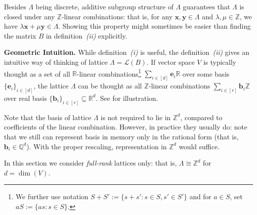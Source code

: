 \documentclass{template}
\begin{document}
Besides $\Lambda$ being discrete, additive subgroup structure of $\Lambda$
guarantees that $\Lambda$ is closed under any $\mathbb{Z}$-linear combinations:
that is, for any $\mathbf{x}, \mathbf{y} \in \Lambda$ and $\lambda, \mu \in
\mathbb{Z}$, we have $\lambda\mathbf{x} + \mu\mathbf{y} \in \Lambda$. Showing
this property might sometimes be easier than finding the matrix $B$ in
definition~\textit{(ii)} explicitly.

\textbf{Geometric Intuition.} While definition~\textit{(i)} is useful, the
definition~\textit{(ii)} gives an intuitive way of thinking of lattice $\Lambda
= \mathcal{L}(B)$. If vector space $V$ is typically thought as a set of all
$\mathbb{R}$-linear combinations\footnote{We further use notation $S+S':=\{s+s':
s \in S, s' \in S'\}$ and for $a \in S$, set $aS := \{as: s \in S\}$.} $\sum_{i
\in [d]}\mathbf{e}_i\mathbb{R}$ over some basis $\{\mathbf{e}_i\}_{i \in [d]}$,
the lattice $\Lambda$ can be thought as all $\mathbb{Z}$-linear combinations
$\sum_{i \in [r]}\mathbf{b}_i\mathbb{Z}$ over real basis $\{\mathbf{b}_i\}_{i
\in [r]} \subseteq \mathbb{R}^d$. See  for illustration.

\begin{remark}\label{remark:lattice-in-integers}
Note that the basis of lattice $\Lambda$ is not required to lie in
$\mathbb{Z}^d$, compared to coefficients of the linear combination. However, in
practice they usually do: note that we still can represent basis in memory only
in the rational form (that is, $\mathbf{b}_i \in \mathbb{Q}^d$). With the proper
rescaling, representation in $\mathbb{Z}^d$ would suffice.
\end{remark}

\begin{remark}
    In this section we consider \textit{full-rank} lattices only: that is,
    $\Lambda \cong \mathbb{Z}^{d}$ for $d=\dim(V)$.
\end{remark}
\end{document}
